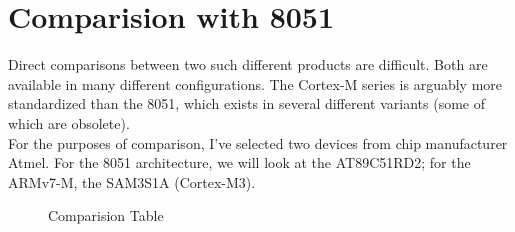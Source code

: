 \documentclass{article}
\begin{document}
\newpage

\section{Comparision with 8051}\label{section:8051}

Direct comparisons between two such different products are difficult.
Both are available in many different configurations. The Cortex-M series is arguably more standardized than the 8051, which exists in several different variants (some of which are obsolete).\\
\newline
For the purposes of comparison, I've selected two devices from chip manufacturer
Atmel. For the 8051 architecture, we will look at the AT89C51RD2; for the ARMv7-M, the
SAM3S1A (Cortex-M3).\\
\newline

\begin{figure}[H]
    \caption{ Comparision Table }
    \label{8051}
  \end{figure}
  
\end{document}
